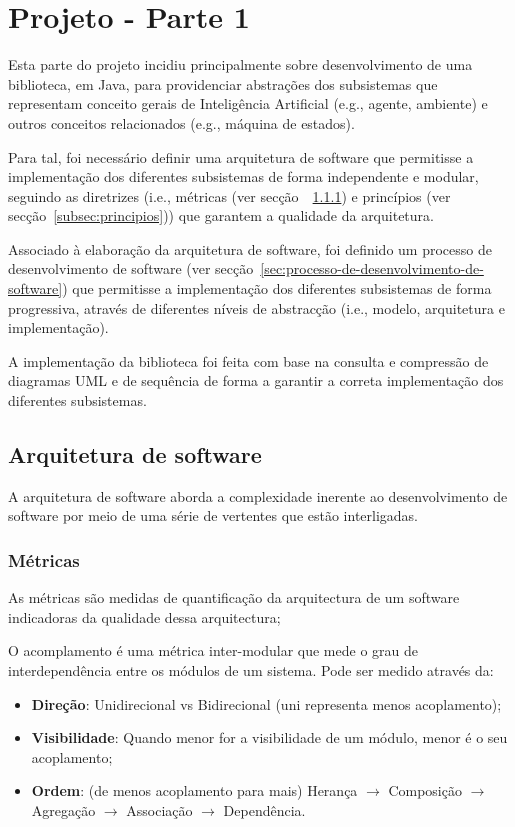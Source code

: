 \chapter{Projeto - Parte 1} \label{ch:projeto-parte1}

Esta parte do projeto incidiu principalmente sobre desenvolvimento de uma biblioteca, em Java, para providenciar abstrações dos subsistemas que representam conceito gerais de Inteligência Artificial (e.g., agente, ambiente) e outros conceitos relacionados (e.g., máquina de estados).

Para tal, foi necessário definir uma arquitetura de software que permitisse a implementação dos diferentes subsistemas de forma independente e modular, seguindo as diretrizes (i.e., métricas (ver secção~~\ref{subsec:metricas}) e princípios (ver secção~\ref{subsec:principios})) que garantem a qualidade da arquitetura.

Associado à elaboração da arquitetura de software, foi definido um processo de desenvolvimento de software (ver secção~\ref{sec:processo-de-desenvolvimento-de-software}) que permitisse a implementação dos diferentes subsistemas de forma progressiva, através de diferentes níveis de abstracção (i.e., modelo, arquitetura e implementação).

A implementação da biblioteca foi feita com base na consulta e compressão de diagramas UML e de sequência de forma a garantir a correta implementação dos diferentes subsistemas.


\section{Arquitetura de software}\label{sec:arquitetura-de-software}

A arquitetura de software aborda a complexidade inerente ao desenvolvimento de software por meio de uma série de vertentes que estão interligadas.

\subsection{Métricas}\label{subsec:metricas}

As métricas são medidas de quantificação da arquitectura de um software indicadoras da qualidade dessa arquitectura;

O acomplamento é uma métrica inter-modular que mede o grau de interdependência entre os módulos de um sistema. Pode ser medido através da:
\begin{itemize}
    \item \textbf{Direção}: Unidirecional vs Bidirecional (uni representa menos acoplamento);
    \item \textbf{Visibilidade}: Quando menor for a visibilidade de um módulo, menor é o seu acoplamento;
    \item \textbf{Ordem}: (de menos acoplamento para mais) Herança $\rightarrow$ Composição $\rightarrow$ Agregação $\rightarrow$ Associação $\rightarrow$ Dependência.
\end{itemize}

